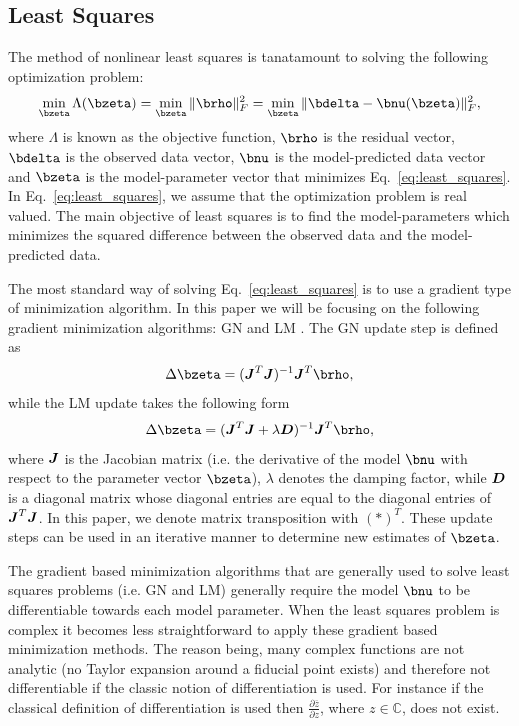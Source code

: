 \documentclass[useAMS,usenatbib]{mn2e}
\newcommand{\bJ}{\bmath{J}}
\newcommand{\bD}{\bmath{D}}
\newcommand{\conj}[1]{\overline{#1}}
\begin{document}
\subsection{Least Squares}
\label{sec:ls}
The method of nonlinear least squares is tanatamount to solving the following optimization problem:  
\begin{equation}
\label{eq:least_squares}
\min_{\bzeta} \Lambda(\bzeta) = \min_{\bzeta} \|\brho\|_F^2 = \min_{\bzeta} \|\bdelta - \bnu(\bzeta)\|_F^2, 
\end{equation}
where $\Lambda$ is known as the objective function, $\brho$ is the residual vector, $\bdelta$ is the observed data vector, $\bnu$ is the model-predicted data vector and $\bzeta$ is the model-parameter vector that minimizes Eq.~\eqref{eq:least_squares}.
In Eq.~\eqref{eq:least_squares}, we assume that the optimization problem is real valued.
The main objective of least squares is to find the model-parameters which minimizes the squared difference between the observed data and the model-predicted data.

The most standard way of solving Eq.~\eqref{eq:least_squares} is to use a gradient type of minimization algorithm. In this paper we will be focusing on the following gradient minimization algorithms: GN and LM \citep{Levenberg1944,Marquardt1963}. 
The GN update step is defined as
\begin{equation}
 \Delta \bzeta = (\bJ^T\bJ)^{-1} \bJ^T\brho,
\end{equation}
while the LM update takes the following form
\begin{equation}
 \Delta \bzeta = (\bJ^T\bJ+\lambda\bD)^{-1} \bJ^T\brho,
\end{equation}
where $\bJ$ is the Jacobian matrix (i.e. the derivative of the model $\bnu$ with respect to the parameter vector $\bzeta$), $\lambda$ denotes the 
damping factor, while $\bD$ is a diagonal matrix whose diagonal entries are equal to the diagonal entries of $\bJ^T\bJ$. In this paper, we denote 
matrix transposition with $(*)^T$.
These update steps can be used in an iterative manner to determine new estimates of $\bzeta$.

The gradient based minimization algorithms that are generally used to solve least squares problems (i.e. GN and LM) generally require the model $\bnu$ to be differentiable
towards each model parameter. When the least squares problem is complex it becomes less straightforward to apply these gradient based minimization methods. The reason being,
many complex functions are not analytic (no Taylor expansion around a fiducial point exists) and therefore not differentiable if the classic notion of differentiation is used. For instance if the 
classical definition of differentiation is used then $\frac{\partial \conj{z}}{\partial z}$, where $z \in \mathbb{C}$, does not exist.
\end{document}
